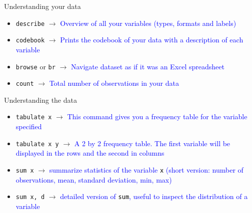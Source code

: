 \documentclass[11pt,notes=hide,aspectratio=169,mathserif]{beamer}
\begin{document}
\begin{frame}{Understanding your data}
\begin{itemize}
    \item \texttt{describe} $\rightarrow$ \textcolor{blue}{Overview of all your variables (types, formats and labels)}
    \item \texttt{codebook} $\rightarrow$ \textcolor{blue}{Prints the codebook of your data with a description of each variable}
    \item \texttt{browse} or \texttt{br} $\rightarrow$ \textcolor{blue}{Navigate dataset as if it was an Excel spreadsheet}
    \item \texttt{count}   $\rightarrow$ \textcolor{blue}{Total number of observations in your data}
\end{itemize}
\end{frame}

\begin{frame}{Understanding the data}
\begin{itemize}
\item \texttt{tabulate x}   $\rightarrow$ \textcolor{blue}{This command gives you a frequency table for the variable specified}
\item \texttt{tabulate x y} $\rightarrow$ \textcolor{blue}{A 2 by 2 frequency table. The first variable will be displayed in the rows and the second in columns} 
\item \texttt{sum x}   $\rightarrow$ \textcolor{blue}{summarize  statistics of the variable \textcolor{black}{\texttt{x}} (short version: number of observations, mean, standard deviation, min, max)} 
\item \texttt{sum x, d}   $\rightarrow$ \textcolor{blue}{detailed version of \textcolor{black}{\texttt{sum}}, useful to inspect the distribution of a variable}
\end{itemize}
\end{frame}
\end{document}
